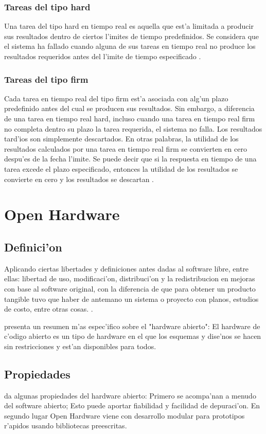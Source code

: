 \subsubsection{Tareas del tipo hard}
Una tarea del tipo hard en tiempo real es aquella que est'a limitada a producir sus resultados dentro de ciertos l'imites de tiempo predefinidos. Se considera que el sistema ha fallado cuando alguna de sus tareas en tiempo real no 
produce los resultados requeridos antes del l'imite de tiempo especificado \citep{mall}. 
	
\subsubsection{Tareas del tipo firm }
Cada tarea en tiempo real del tipo firm est'a asociada con alg'un plazo predefinido antes del cual se producen sus resultados. Sin embargo, a diferencia de una tarea en tiempo real hard, incluso cuando una tarea en tiempo real firm no completa dentro su plazo la tarea requerida, el sistema no falla. Los resultados tard'ios son simplemente descartados. En otras palabras, la utilidad de los resultados calculados por una tarea en tiempo real firm se convierten en cero despu'es de la fecha l'imite. Se puede decir que si la respuesta en tiempo de una tarea excede el plazo especificado, entonces la utilidad de los resultados se convierte en cero y los resultados se descartan \citep{mall}.
\section{Open Hardware}

\subsection{Definici'on}

Aplicando ciertas libertades y definiciones antes dadas al software libre, entre ellas: libertad de uso, modificaci'on, distribuci'on y la redistribucion en mejoras con base al software original, con la diferencia de que para obtener un producto tangible tuvo que haber de antemano un sistema o proyecto con planos, estudios de costo, entre otras cosas. \citep{hernando}.

\citet{russell} presenta un resumen m'as espec'ifico sobre el "hardware abierto": El hardware de c'odigo abierto es un tipo de hardware en el que los esquemas y dise'nos se hacen sin restricciones y est'an disponibles para todos.
\subsection{Propiedades}
\citet{russell} da algunas propiedades del hardware abierto: Primero se acompa'nan a menudo del software abierto; Esto puede aportar fiabilidad y facilidad de depuraci'on. En segundo lugar Open Hardware viene con desarrollo modular para prototipos r'apidos usando bibliotecas preescritas.

